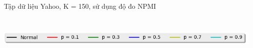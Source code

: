 \documentclass[pdf]{beamer}
\begin{document}
\begin{frame}{Tập dữ liệu Yahoo, K = 150, sử dụng độ đo NPMI }
\begin{columns}[T] %
\begin{column}{.50\textwidth}
\begin{figure}
\end{figure}
\end{column} %
\hfill%
\begin{column}{.50\textwidth}
\begin{figure}
\end{figure}				
\end{column} %
\end{columns}
\begin{center}
\includegraphics[width=1\textwidth]{menu.png}	
\end{center}
\end{frame}
\end{document}

